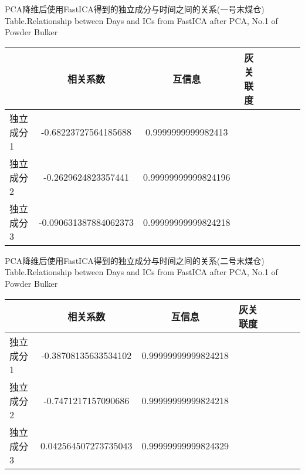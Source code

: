 \begin{table}[!htb]
\begin{center}
		{PCA降维后使用FastICA得到的独立成分与时间之间的关系(一号末煤仓)}
			{Table.}{Relationship between Days and ICs from FastICA after PCA, No.1 of Powder Bulker}
\begin{tabular}{lccclccc}
\toprule
                & 相关系数     					& 互信息      					&灰关联度 \\
\midrule
  独立成分1     &  -0.68223727564185688  	& 0.9999999999982413   		&    \\
  独立成分2     &  -0.2629624823357441	      	& 0.99999999999824196   	&    \\
  独立成分3     &  -0.090631387884062373	& 0.99999999999824218   	&    \\
 \bottomrule
\end{tabular}
\end{center}
\end{table}

\begin{table}[!htb]
\begin{center}
		{PCA降维后使用FastICA得到的独立成分与时间之间的关系(二号末煤仓)}
			{Table.}{Relationship between Days and ICs from FastICA after PCA, No.1 of Powder Bulker}
\begin{tabular}{lccclccc}
\toprule
                & 相关系数     					& 互信息      					&灰关联度 \\
\midrule
  独立成分1     &  -0.38708135633534102  	& 0.99999999999824218 		&    \\
  独立成分2     &  -0.7471217157090686	      	& 0.99999999999824218   	&    \\
  独立成分3     &  0.042564507273735043	& 0.99999999999824329   	&    \\
 \bottomrule
\end{tabular}
\end{center}
\end{table}

